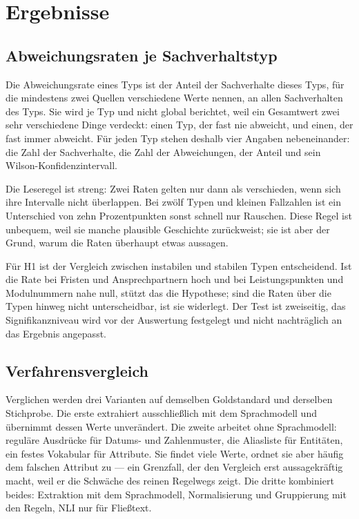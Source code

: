 
\section{Ergebnisse}
\label{sec:ergebnisse}

\subsection{Abweichungsraten je Sachverhaltstyp}

Die Abweichungsrate eines Typs ist der Anteil der Sachverhalte dieses Typs, für die
mindestens zwei Quellen verschiedene Werte nennen, an allen Sachverhalten des Typs. Sie
wird je Typ und nicht global berichtet, weil ein Gesamtwert zwei sehr verschiedene Dinge
verdeckt: einen Typ, der fast nie abweicht, und einen, der fast immer abweicht. Für jeden
Typ stehen deshalb vier Angaben nebeneinander: die Zahl der Sachverhalte, die Zahl der
Abweichungen, der Anteil und sein Wilson-Konfidenzintervall.

Die Leseregel ist streng: Zwei Raten gelten nur dann als verschieden, wenn sich ihre
Intervalle nicht überlappen. Bei zwölf Typen und kleinen Fallzahlen ist ein Unterschied von
zehn Prozentpunkten sonst schnell nur Rauschen. Diese Regel ist unbequem, weil sie manche
plausible Geschichte zurückweist; sie ist aber der Grund, warum die Raten überhaupt etwas
aussagen.

Für H1 ist der Vergleich zwischen instabilen und stabilen Typen entscheidend. Ist die Rate
bei Fristen und Ansprechpartnern hoch und bei Leistungspunkten und Modulnummern nahe null,
stützt das die Hypothese; sind die Raten über die Typen hinweg nicht unterscheidbar, ist sie
widerlegt. Der Test ist zweiseitig, das Signifikanzniveau wird vor der Auswertung
festgelegt und nicht nachträglich an das Ergebnis angepasst.


\subsection{Verfahrensvergleich}

Verglichen werden drei Varianten auf demselben Goldstandard und derselben Stichprobe. Die
erste extrahiert ausschließlich mit dem Sprachmodell und übernimmt dessen Werte unverändert.
Die zweite arbeitet ohne Sprachmodell: reguläre Ausdrücke für Datums- und Zahlenmuster, die
Aliasliste für Entitäten, ein festes Vokabular für Attribute. Sie findet viele Werte, ordnet
sie aber häufig dem falschen Attribut zu --- ein Grenzfall, der den Vergleich erst
aussagekräftig macht, weil er die Schwäche des reinen Regelwegs zeigt. Die dritte kombiniert
beides: Extraktion mit dem Sprachmodell, Normalisierung und Gruppierung mit den Regeln, NLI
nur für Fließtext.

